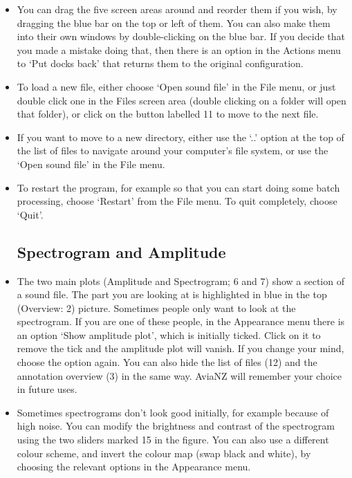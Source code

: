 \documentclass{article}
\begin{document}
\begin{itemize}
\item You can drag the five screen areas around and reorder them if you wish, by dragging the blue bar on the top or left of them. You can also make them into their own windows by double-clicking on the blue bar. If you decide that you made a mistake doing that, then there is an option in the Actions menu to `Put docks back' that returns them to the original configuration.

\item To load a new file, either choose `Open sound file' in the File menu, or just double click one in the Files screen area (double clicking on a folder will open that folder), or click on the button labelled 11 to move to the next file. 

\item If you want to move to a new directory, either use the `..' option at the top of the list of files to navigate around your computer's file system, or use the  `Open sound file' in the File menu.

\item To restart the program, for example so that you can start doing some batch processing, choose `Restart' from the File menu. To quit completely, choose `Quit'. 


\subsection{Spectrogram and Amplitude}

\item The two main plots (Amplitude and Spectrogram; 6 and 7) show a section of a sound file. The part you are looking at is highlighted in blue in the top (Overview: 2) picture. Sometimes people only want to look at the spectrogram. If you are one of these people, in the Appearance menu there is an option `Show amplitude plot', which is initially ticked. Click on it to remove the tick and the amplitude plot will vanish. If you change your mind, choose the option again. You can also hide the list of files (12) and the annotation overview (3) in the same way. AviaNZ will remember your choice in future uses.

\item Sometimes spectrograms don't look good initially, for example because of high noise. You can modify the brightness and contrast of the spectrogram using the two sliders marked 15 in the figure. You can also use a different colour scheme, and invert the colour map (swap black and white), by choosing the relevant options in the Appearance menu. 


\end{itemize}
\end{document}
